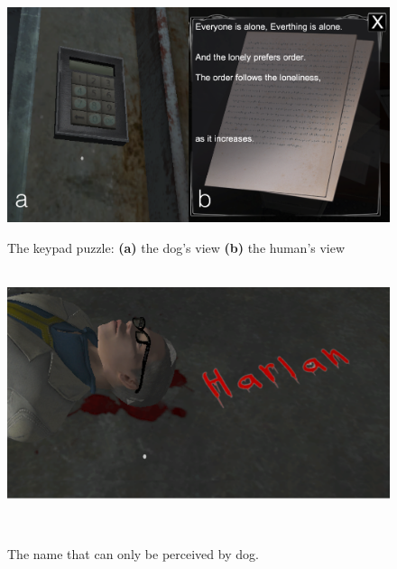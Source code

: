 \documentclass{sigchi}
\begin{document}
\begin{figure}[H]
        \centering
        \includegraphics[width=\linewidth]{images/puzzle1.png}
        \caption{The keypad puzzle: \textbf{(a)}  the dog's view \textbf{(b)} the human's view}
        \label{fig:puzzle1}
    \endminipage
    ~ %
        \centering
        \includegraphics[width=\linewidth]{images/puzzle4_name.png}
        \caption{The name that can only be perceived by dog.}
        \label{fig:puzzle4_name}
    \endminipage
    ~ %
\end{figure}
\end{document}
